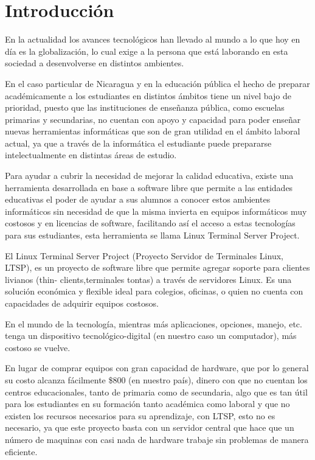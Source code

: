 \documentclass[12pt]{report}
\begin{document}
\section{Introducci\'on}
En la actualidad los avances tecnol\'ogicos han llevado al mundo a lo que hoy en día es la globalizaci\'on, lo cual exige a la persona que est\'a 
laborando en esta sociedad a desenvolverse en distintos ambientes. 

En el caso particular de Nicaragua y en la educaci\'on p\'ublica el hecho de preparar 
acad\'emicamente a los estudiantes en distintos \'ambitos tiene un nivel bajo de prioridad, puesto que las instituciones de enseñanza p\'ublica, como 
escuelas primarias y secundarias, no cuentan con apoyo y capacidad para poder enseñar nuevas herramientas inform\'aticas que son de gran utilidad en 
el \'ambito laboral actual, ya que a trav\'es de la inform\'atica el estudiante puede prepararse intelectualmente en distintas \'areas de estudio. 

Para ayudar a cubrir la necesidad de mejorar la calidad educativa, existe una herramienta desarrollada en base a software libre que permite a las 
entidades educativas el poder de ayudar a sus alumnos a conocer estos ambientes inform\'aticos sin necesidad de que la misma invierta en equipos 
inform\'aticos muy costosos y en licencias de software, facilitando así el acceso a estas tecnolog\'ias para sus estudiantes, esta herramienta se 
llama Linux Terminal Server Project. 

El Linux Terminal Server Project (Proyecto Servidor de Terminales Linux, LTSP), es un proyecto de software libre que permite agregar soporte para 
clientes livianos (thin- clients,terminales tontas) a trav\'es de servidores Linux. Es una soluci\'on econ\'omica y flexible ideal para colegios, 
oficinas, o quien no cuenta con capacidades de adquirir equipos costosos. 

En el mundo de la tecnolog\'ia, mientras m\'as aplicaciones, opciones, manejo, etc. tenga un dispositivo tecnol\'ogico-digital (en nuestro caso un 
computador), m\'as costoso se vuelve. 

En lugar de comprar equipos con gran capacidad de hardware, que por lo general su costo alcanza f\'acilmente \$800 (en nuestro pa\'is), dinero con 
que no cuentan los centros educacionales, tanto de primaria como de secundaria, algo que es tan \'util para los estudiantes en su formaci\'on tanto 
acad\'emica como laboral y que no existen los recursos necesarios para su aprendizaje, con LTSP, esto no es necesario, ya que este proyecto basta 
con un servidor central que hace que un n\'umero de maquinas con casi nada de hardware trabaje sin problemas de manera eficiente. 
\end{document}
